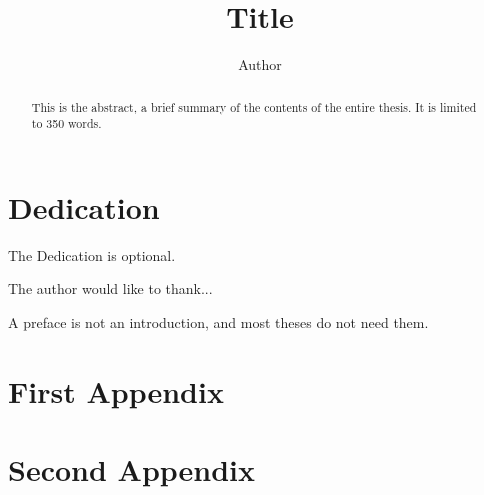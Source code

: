 \documentclass[12pt]{report}
\title{Title}
\author{Author}
\begin{document}

\maketitle    %

\begin{abstract}
This is the abstract, a brief summary of the contents of the entire thesis.
It is limited to 350 words.
\end{abstract}


\chapter*{Dedication}

The Dedication is optional.



The author would like to thank...



A preface is not an introduction, and most theses do not need them.


\tableofcontents

\listoffigures  %
\listoftables   %

\newpage












\appendices  %


\chapter{First Appendix}\label{app:first}

\chapter{Second Appendix}

%




\typeout{***}
\typeout{***}
\end{document}
